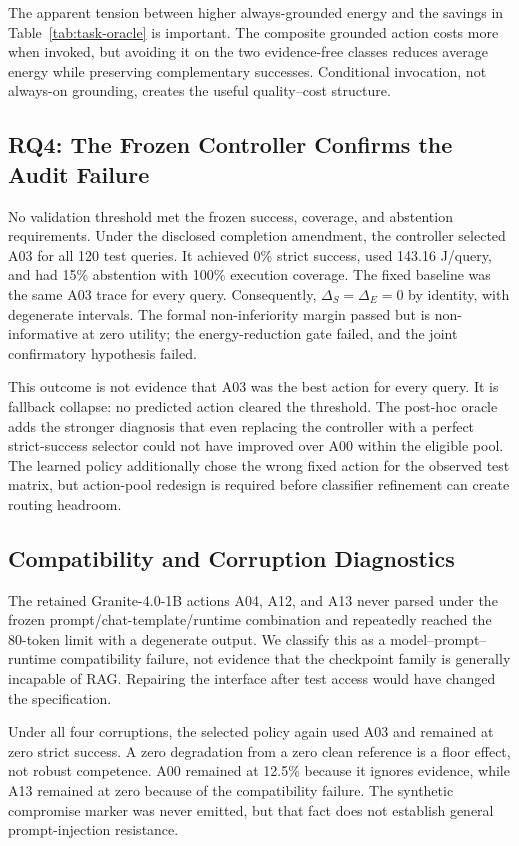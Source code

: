 The apparent tension between higher always-grounded energy and the savings in
Table~\ref{tab:task-oracle} is important. The composite grounded action costs more
when invoked, but avoiding it on the two evidence-free classes reduces average
energy while preserving complementary successes. Conditional invocation, not
always-on grounding, creates the useful quality--cost structure.

\subsection{RQ4: The Frozen Controller Confirms the Audit Failure}



No validation threshold met the frozen success, coverage, and abstention
requirements. Under the disclosed completion amendment, the controller selected
A03 for all 120 test queries. It achieved 0\% strict success, used 143.16 J/query,
and had 15\% abstention with 100\% execution coverage. The fixed baseline was the
same A03 trace for every query. Consequently, $\Delta_S=\Delta_E=0$ by identity,
with degenerate intervals. The formal non-inferiority margin passed but is
non-informative at zero utility; the energy-reduction gate failed, and the joint
confirmatory hypothesis failed.

This outcome is not evidence that A03 was the best action for every query. It is
fallback collapse: no predicted action cleared the threshold. The post-hoc oracle
adds the stronger diagnosis that even replacing the controller with a perfect
strict-success selector could not have improved over A00 within the eligible pool.
The learned policy additionally chose the wrong fixed action for the observed test
matrix, but action-pool redesign is required before classifier refinement can create
routing headroom.

\subsection{Compatibility and Corruption Diagnostics}

The retained Granite-4.0-1B actions A04, A12, and A13 never parsed under the frozen
prompt/chat-template/runtime combination and repeatedly reached the 80-token limit
with a degenerate output. We classify this as a model--prompt--runtime compatibility
failure, not evidence that the checkpoint family is generally incapable of RAG.
Repairing the interface after test access would have changed the specification.

Under all four corruptions, the selected policy again used A03 and remained at zero
strict success. A zero degradation from a zero clean reference is a floor effect,
not robust competence. A00 remained at 12.5\% because it ignores evidence, while
A13 remained at zero because of the compatibility failure. The synthetic
compromise marker was never emitted, but that fact does not establish general
prompt-injection resistance.
